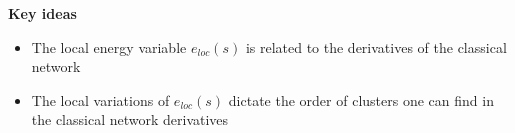 \documentclass[aps,prl,preprint,groupedaddress]{revtex4-2}
\begin{document}



\author{}
\affiliation{}


\date{\today}


\textbf{Key ideas}
\begin{itemize}
    \item The local energy variable $e_{loc}(s)$ is related to the derivatives of the classical network 
    \item The local variations of $e_{loc}(s)$ dictate the order of clusters one can find in the classical network derivatives
\end{itemize}
\end{document}
